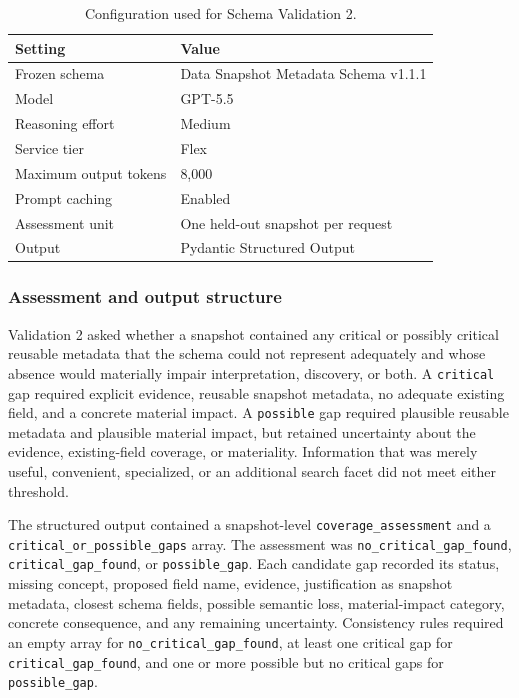 \documentclass{article}
\begin{document}
\begin{table}[!ht]
    \centering
    \caption{Configuration used for Schema Validation 2.}
    \label{tab:schema_validation2_configuration}
    \begin{tabular}{ll}
    \toprule
    \textbf{Setting} & \textbf{Value} \\
    \midrule
    Frozen schema & Data Snapshot Metadata Schema v1.1.1 \\
    Model & GPT-5.5 \\
    Reasoning effort & Medium \\
    Service tier & Flex \\
    Maximum output tokens & 8,000 \\
    Prompt caching & Enabled \\
    Assessment unit & One held-out snapshot per request \\
    Output & Pydantic Structured Output \\
    \bottomrule
    \end{tabular}
\end{table}

\subsubsection{Assessment and output structure}

Validation 2 asked whether a snapshot contained any critical or possibly critical reusable metadata that the schema could not represent adequately and whose absence would materially impair interpretation, discovery, or both. A \texttt{critical} gap required explicit evidence, reusable snapshot metadata, no adequate existing field, and a concrete material impact. A \texttt{possible} gap required plausible reusable metadata and plausible material impact, but retained uncertainty about the evidence, existing-field coverage, or materiality. Information that was merely useful, convenient, specialized, or an additional search facet did not meet either threshold.

The structured output contained a snapshot-level \texttt{coverage\_assessment} and a \texttt{critical\_or\_possible\_gaps} array. The assessment was \texttt{no\_critical\_gap\_found}, \texttt{critical\_gap\_found}, or \texttt{possible\_gap}. Each candidate gap recorded its status, missing concept, proposed field name, evidence, justification as snapshot metadata, closest schema fields, possible semantic loss, material-impact category, concrete consequence, and any remaining uncertainty. Consistency rules required an empty array for \texttt{no\_critical\_gap\_found}, at least one critical gap for \texttt{critical\_gap\_found}, and one or more possible but no critical gaps for \texttt{possible\_gap}.
\end{document}
